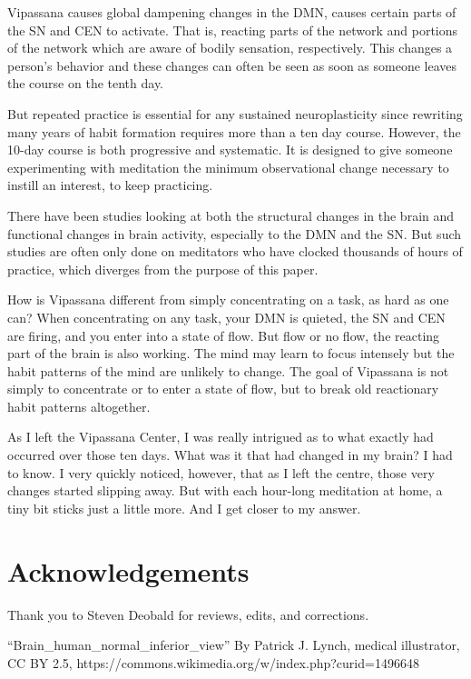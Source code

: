 \documentclass[a4paper, amsfonts, amssymb, amsmath, reprint, showkeys, nofootinbib, twoside]{revtex4-1}
\begin{document}
Vipassana causes global dampening changes in the DMN, causes certain parts of
the SN and CEN to activate. That is, reacting parts of the network and
portions of the network which are aware of bodily sensation, respectively.
This changes a person's behavior and these changes can often be seen as soon as
someone leaves the course on the tenth day.

But repeated practice is essential for any sustained neuroplasticity since rewriting
many years of habit formation requires more than a ten day course. However, the
10-day course is both progressive and systematic. It is designed to give someone
experimenting with meditation the minimum observational change necessary to instill
an interest, to keep practicing.

There have been studies looking at both the structural changes in the brain and
functional changes in brain activity, especially to the DMN and the SN. But such
studies are often only done on meditators who have clocked thousands of hours of
practice, which diverges from the purpose of this paper. \cite{tibetanmonks,
  experiencemed, experiencemeda}

How is Vipassana different from simply concentrating on a task, as hard as one can?
When concentrating on any task, your DMN is quieted, the SN and CEN are firing, and you
enter into a state of flow. But flow or no flow, the reacting part of the brain is
also working. The mind may learn to focus intensely but the habit patterns of the
mind are unlikely to change. The goal of Vipassana is not simply to concentrate or to
enter a state of flow, but to break old reactionary habit patterns altogether.

As I left the Vipassana Center, I was really intrigued as to what exactly had
occurred over those ten days. What was it that had changed in my brain? I had to
know. I very quickly noticed, however, that as I left the centre, those very changes
started slipping away. But with each hour-long meditation at home, a tiny bit sticks
just a little more. And I get closer to my answer.

\section{Acknowledgements}

Thank you to Steven Deobald for reviews, edits, and corrections.

``Brain\_human\_normal\_inferior\_view'' By Patrick J. Lynch, medical illustrator, CC BY
2.5, https://commons.wikimedia.org/w/index.php?curid=1496648
\end{document}
